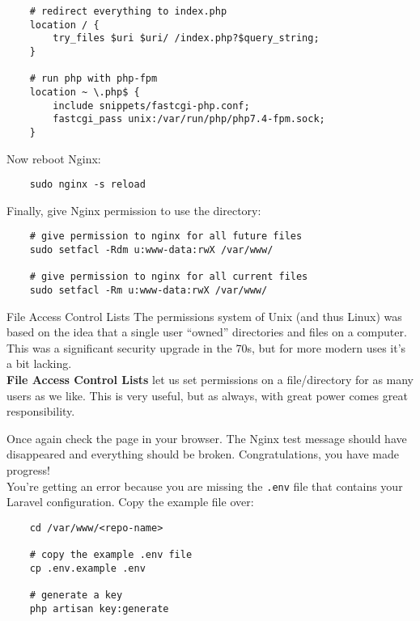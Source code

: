 \begin{verbatim}
    # redirect everything to index.php
    location / {
        try_files $uri $uri/ /index.php?$query_string;
    }

    # run php with php-fpm
    location ~ \.php$ {
        include snippets/fastcgi-php.conf;
        fastcgi_pass unix:/var/run/php/php7.4-fpm.sock;
    }
\end{verbatim}

Now reboot Nginx:

\begin{verbatim}
    sudo nginx -s reload
\end{verbatim}

Finally, give Nginx permission to use the directory:

\begin{verbatim}
    # give permission to nginx for all future files
    sudo setfacl -Rdm u:www-data:rwX /var/www/

    # give permission to nginx for all current files
    sudo setfacl -Rm u:www-data:rwX /var/www/
\end{verbatim}

\begin{infobox}{File Access Control Lists}
    The permissions system of Unix (and thus Linux) was based on the idea that a single user ``owned'' directories and files on a computer. This was a significant security upgrade in the 70s, but for more modern uses it's a bit lacking.
    \\

    \textbf{File Access Control Lists} let us set permissions on a file/directory for as many users as we like. This is very useful, but as always, with great power comes great responsibility.
\end{infobox}

Once again check the page in your browser. The Nginx test message should have disappeared and everything should be broken. Congratulations, you have made progress!
\\

You're getting an error because you are missing the \texttt{.env} file that contains your Laravel configuration. Copy the example file over:

\begin{verbatim}
    cd /var/www/<repo-name>

    # copy the example .env file
    cp .env.example .env

    # generate a key
    php artisan key:generate
\end{verbatim}

